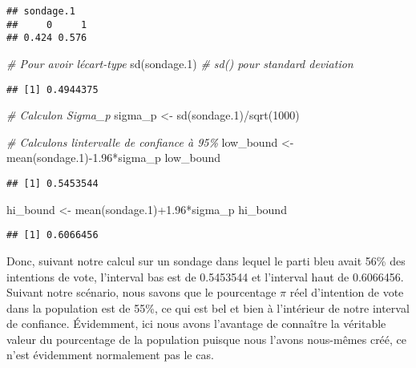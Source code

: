 \documentclass[
]{book}
\newenvironment{Shaded}{\begin{snugshade}}{\end{snugshade}}
\newcommand{\CommentTok}[1]{\textcolor[rgb]{0.56,0.35,0.01}{\textit{#1}}}
\newcommand{\DecValTok}[1]{\textcolor[rgb]{0.00,0.00,0.81}{#1}}
\newcommand{\FloatTok}[1]{\textcolor[rgb]{0.00,0.00,0.81}{#1}}
\newcommand{\FunctionTok}[1]{\textcolor[rgb]{0.00,0.00,0.00}{#1}}
\newcommand{\NormalTok}[1]{#1}
\newcommand{\OtherTok}[1]{\textcolor[rgb]{0.56,0.35,0.01}{#1}}
\newcommand{\SpecialCharTok}[1]{\textcolor[rgb]{0.00,0.00,0.00}{#1}}
\begin{document}
\begin{verbatim}
## sondage.1
##     0     1 
## 0.424 0.576
\end{verbatim}

\begin{Shaded}
\begin{Highlighting}[]
\CommentTok{\# Pour avoir l\textquotesingle{}écart{-}type}
\FunctionTok{sd}\NormalTok{(sondage}\FloatTok{.1}\NormalTok{) }\CommentTok{\# sd() pour standard deviation}
\end{Highlighting}
\end{Shaded}

\begin{verbatim}
## [1] 0.4944375
\end{verbatim}

\begin{Shaded}
\begin{Highlighting}[]
\CommentTok{\# Calculon Sigma\_p}
\NormalTok{sigma\_p }\OtherTok{\textless{}{-}} \FunctionTok{sd}\NormalTok{(sondage}\FloatTok{.1}\NormalTok{)}\SpecialCharTok{/}\FunctionTok{sqrt}\NormalTok{(}\DecValTok{1000}\NormalTok{)}

\CommentTok{\# Calculons l\textquotesingle{}intervalle de confiance à 95\%}
\NormalTok{low\_bound }\OtherTok{\textless{}{-}} \FunctionTok{mean}\NormalTok{(sondage}\FloatTok{.1}\NormalTok{)}\SpecialCharTok{{-}}\FloatTok{1.96}\SpecialCharTok{*}\NormalTok{sigma\_p}
\NormalTok{low\_bound}
\end{Highlighting}
\end{Shaded}

\begin{verbatim}
## [1] 0.5453544
\end{verbatim}

\begin{Shaded}
\begin{Highlighting}[]
\NormalTok{hi\_bound }\OtherTok{\textless{}{-}} \FunctionTok{mean}\NormalTok{(sondage}\FloatTok{.1}\NormalTok{)}\SpecialCharTok{+}\FloatTok{1.96}\SpecialCharTok{*}\NormalTok{sigma\_p}
\NormalTok{hi\_bound}
\end{Highlighting}
\end{Shaded}

\begin{verbatim}
## [1] 0.6066456
\end{verbatim}

Donc, suivant notre calcul sur un sondage dans lequel le parti bleu avait 56\% des intentions de vote, l'interval bas est de 0.5453544 et l'interval haut de 0.6066456. Suivant notre scénario, nous savons que le pourcentage \(\pi\) réel d'intention de vote dans la population est de 55\%, ce qui est bel et bien à l'intérieur de notre interval de confiance. Évidemment, ici nous avons l'avantage de connaître la véritable valeur du pourcentage de la population puisque nous l'avons nous-mêmes créé, ce n'est évidemment normalement pas le cas.
\end{document}

